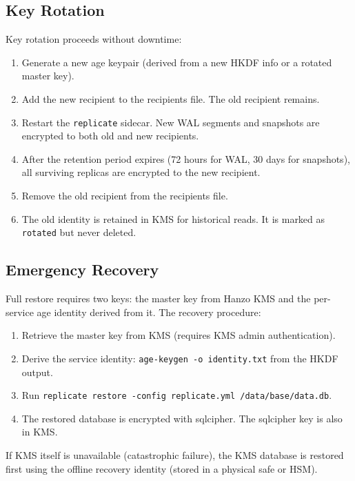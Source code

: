 \subsection{Key Rotation}

Key rotation proceeds without downtime:

\begin{enumerate}[nosep]
    \item Generate a new age keypair (derived from a new HKDF info or a
    rotated master key).
    \item Add the new recipient to the recipients file. The old recipient
    remains.
    \item Restart the \texttt{replicate} sidecar. New WAL segments and
    snapshots are encrypted to both old and new recipients.
    \item After the retention period expires (72 hours for WAL, 30 days for
    snapshots), all surviving replicas are encrypted to the new recipient.
    \item Remove the old recipient from the recipients file.
    \item The old identity is retained in KMS for historical reads. It is
    marked as \texttt{rotated} but never deleted.
\end{enumerate}

\subsection{Emergency Recovery}

Full restore requires two keys: the master key from Hanzo KMS and the
per-service age identity derived from it. The recovery procedure:

\begin{enumerate}[nosep]
    \item Retrieve the master key from KMS (requires KMS admin
    authentication).
    \item Derive the service identity:
    \texttt{age-keygen -o identity.txt} from the HKDF output.
    \item Run \texttt{replicate restore -config replicate.yml
    /data/base/data.db}.
    \item The restored database is encrypted with sqlcipher. The sqlcipher key
    is also in KMS.
\end{enumerate}

If KMS itself is unavailable (catastrophic failure), the KMS database is
restored first using the offline recovery identity (stored in a physical
safe or HSM).

